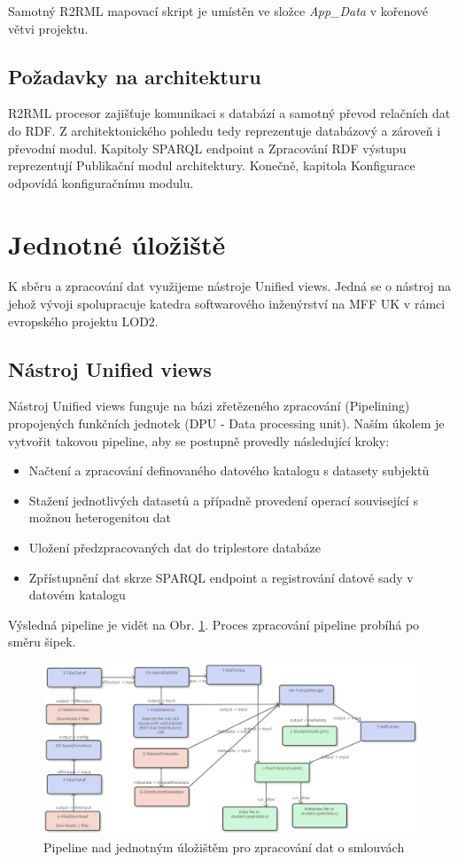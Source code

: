 Samotný R2RML mapovací skript je umístěn ve složce \textit{App\_Data} v kořenové větvi projektu.

\subsection{Požadavky na architekturu}

R2RML procesor zajišťuje komunikaci s databází a samotný převod relačních dat do RDF. Z architektonického pohledu tedy reprezentuje databázový a zároveň i převodní modul. Kapitoly SPARQL endpoint a Zpracování RDF výstupu reprezentují Publikační modul architektury. Konečně, kapitola Konfigurace odpovídá konfiguračnímu modulu.

\section{Jednotné úložiště}

K sběru a zpracování dat využijeme nástroje Unified views. Jedná se o nástroj na jehož vývoji spolupracuje katedra softwarového inženýrství na MFF UK v rámci evropského projektu LOD2\cite{lod2}.

\subsection{Nástroj Unified views}

Nástroj Unified views funguje na bázi zřetězeného zpracování (Pipelining) propojených funkčních jednotek (DPU - Data processing unit). Naším úkolem je vytvořit takovou pipeline, aby se postupně provedly následující kroky:

\begin{itemize}
\item Načtení a zpracování definovaného datového katalogu s datasety subjektů
\item Stažení jednotlivých datasetů a případně provedení operací související s možnou heterogenitou dat
\item Uložení předzpracovaných dat do triplestore databáze
\item Zpřístupnění dat skrze SPARQL endpoint a registrování datové sady v datovém katalogu
\end{itemize}

Výsledná pipeline je vidět na Obr. \ref{obr:unv}. Proces zpracování pipeline probíhá po směru šipek. 

\begin{figure}[H]
\centerline{\includegraphics[width=\textwidth]{img/unv.eps}}
\caption{Pipeline nad jednotným úložištěm pro zpracování dat o smlouvách}
\label{obr:unv}
\end{figure}

